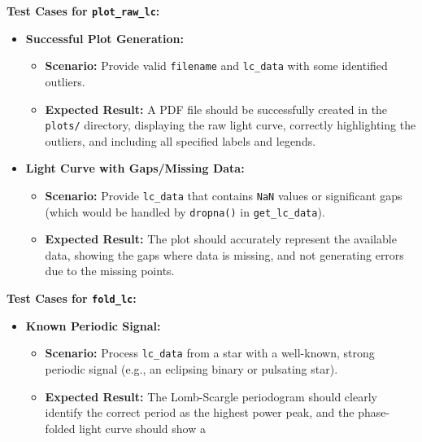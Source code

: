 \documentclass[a4paper,12pt]{article}
\DeclareRobustCommand{\bold}{\fontseries{b}\selectfont}
\newcommand{\bcode}[1]{\texttt{\fontsize{11}{13}\selectfont\bold#1}}
\newenvironment{solution}{}{}
\begin{document}
\begin{enumerate}
\begin{solution}
\begin{itemize}
            \end{itemize}
            \textbf{Test Cases for \bcode{plot\_raw\_lc}:}  
            \begin{itemize}
                \item \textbf{Successful Plot Generation:}
                \begin{itemize}
                    \item \textbf{Scenario:} Provide valid \bcode{filename} and
                    \bcode{lc\_data} with some identified outliers.
                    \item \textbf{Expected Result:} A PDF file should be
                    successfully created in the \bcode{plots/} directory,
                    displaying the raw light curve, correctly highlighting the
                    outliers, and including all specified labels and legends.
                \end{itemize}
                \item \textbf{Light Curve with Gaps/Missing Data:}
                \begin{itemize}
                    \item \textbf{Scenario:} Provide \bcode{lc\_data} that contains
                    \bcode{NaN} values or significant gaps (which would be handled
                    by \bcode{dropna()} in \bcode{get\_lc\_data}).
                    \item \textbf{Expected Result:} The plot should accurately
                    represent the available data, showing the gaps where data is
                    missing, and not generating errors due to the missing points.
                \end{itemize}
            \end{itemize} \pagebreak
            \textbf{Test Cases for \bcode{fold\_lc}:}
            \begin{itemize}
                \item \textbf{Known Periodic Signal:}
                \begin{itemize}
                    \item \textbf{Scenario:} Process \bcode{lc\_data} from a star
                    with a well-known, strong periodic signal (e.g., an eclipsing
                    binary or pulsating star).
                    \item \textbf{Expected Result:} The Lomb-Scargle periodogram
                    should clearly identify the correct period as the highest
                    power peak, and the phase-folded light curve should show a

\end{itemize}
\end{itemize}
\end{solution}
\end{enumerate}
\end{document}

